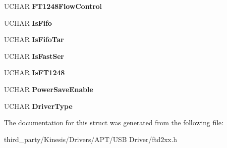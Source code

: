 \begin{DoxyCompactItemize}
\item 
U\+C\+H\+AR {\bfseries F\+T1248\+Flow\+Control}\hypertarget{structft__eeprom__232h_adc5ff9bac7226be7b3181a64f24450dc}{}\label{structft__eeprom__232h_adc5ff9bac7226be7b3181a64f24450dc}

\item 
U\+C\+H\+AR {\bfseries Is\+Fifo}\hypertarget{structft__eeprom__232h_a5b6fa725478fe8f58ef4aa232ff4f6c4}{}\label{structft__eeprom__232h_a5b6fa725478fe8f58ef4aa232ff4f6c4}

\item 
U\+C\+H\+AR {\bfseries Is\+Fifo\+Tar}\hypertarget{structft__eeprom__232h_a73d9b80c5b4c07b2085deeb4689b4371}{}\label{structft__eeprom__232h_a73d9b80c5b4c07b2085deeb4689b4371}

\item 
U\+C\+H\+AR {\bfseries Is\+Fast\+Ser}\hypertarget{structft__eeprom__232h_ad214d1fe4bf5bf916c5364777f9dc1a8}{}\label{structft__eeprom__232h_ad214d1fe4bf5bf916c5364777f9dc1a8}

\item 
U\+C\+H\+AR {\bfseries Is\+F\+T1248}\hypertarget{structft__eeprom__232h_aa2b426719debc007b4ce6166524ca68f}{}\label{structft__eeprom__232h_aa2b426719debc007b4ce6166524ca68f}

\item 
U\+C\+H\+AR {\bfseries Power\+Save\+Enable}\hypertarget{structft__eeprom__232h_a60637cdb433234aa02093455605abca9}{}\label{structft__eeprom__232h_a60637cdb433234aa02093455605abca9}

\item 
U\+C\+H\+AR {\bfseries Driver\+Type}\hypertarget{structft__eeprom__232h_a629a028c1c415f2f9104fe7e30154039}{}\label{structft__eeprom__232h_a629a028c1c415f2f9104fe7e30154039}

\end{DoxyCompactItemize}


The documentation for this struct was generated from the following file\+:\begin{DoxyCompactItemize}
\item 
third\+\_\+party/\+Kinesis/\+Drivers/\+A\+P\+T/\+U\+S\+B Driver/ftd2xx.\+h\end{DoxyCompactItemize}
